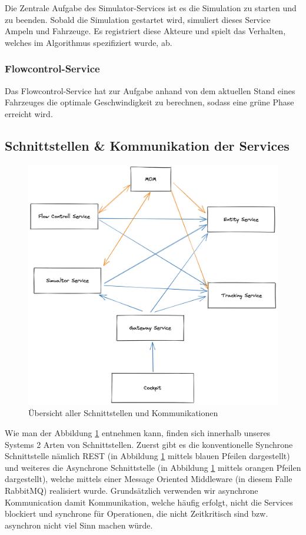 Die Zentrale Aufgabe des Simulator-Services ist es die Simulation zu starten und zu beenden. Sobald die Simulation gestartet wird, simuliert dieses Service Ampeln und Fahrzeuge. Es registriert diese Akteure und spielt das Verhalten, welches im Algorithmus spezifiziert wurde, ab.

\subsubsection{Flowcontrol-Service}

Das Flowcontrol-Service hat zur Aufgabe anhand von dem aktuellen Stand eines Fahrzeuges die optimale Geschwindigkeit zu berechnen, sodass eine grüne Phase erreicht wird. 

\subsection{Schnittstellen \& Kommunikation der Services}

\begin{figure}[h]
	\centering
	\includegraphics[width=1\textwidth]{./figures/whole_system_communication.png}
	\caption{Übersicht aller Schnittstellen und Kommunikationen}
	\label{fig:wholesystem_view}
\end{figure}

Wie man der Abbildung \ref{fig:wholesystem_view} entnehmen kann, finden sich innerhalb unseres Systems 2 Arten von Schnittstellen. Zuerst gibt es die konventionelle Synchrone Schnittstelle nämlich REST (in Abbildung \ref{fig:wholesystem_view} mittels blauen Pfeilen dargestellt) und weiteres die Asynchrone Schnittstelle (in Abbildung \ref{fig:wholesystem_view} mittels orangen Pfeilen dargestellt), welche mittels einer Message Oriented Middleware (in diesem Falle RabbitMQ) realisiert wurde.
Grundsätzlich verwenden wir asynchrone Kommunication damit Kommunikation, welche häufig erfolgt, nicht die Services blockiert und synchrone für Operationen, die nicht Zeitkritisch sind bzw. asynchron nicht viel Sinn machen würde.

